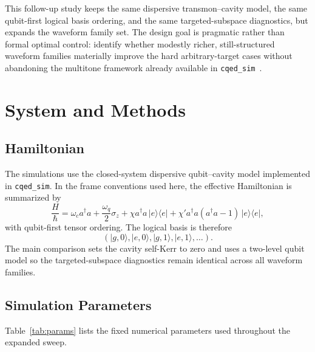 \documentclass[aps,pra,twocolumn,reprint,floatfix,amsmath,amssymb]{revtex4-2}
\begin{document}
This follow-up study keeps the same dispersive transmon--cavity model, the same qubit-first logical basis ordering, and the same targeted-subspace diagnostics, but expands the waveform family set. The design goal is pragmatic rather than formal optimal control: identify whether modestly richer, still-structured waveform families materially improve the hard arbitrary-target cases without abandoning the multitone framework already available in \texttt{cqed\_sim}~\cite{cqed_sim}.

\section{System and Methods}
\subsection{Hamiltonian}
The simulations use the closed-system dispersive qubit--cavity model implemented in \texttt{cqed\_sim}. In the frame conventions used here, the effective Hamiltonian is summarized by
\begin{equation}
\frac{H}{\hbar} = \omega_c a^\dagger a + \frac{\omega_q}{2}\sigma_z + \chi a^\dagger a \, |e\rangle\langle e| + \chi' a^\dagger a (a^\dagger a - 1) \, |e\rangle\langle e|,
\end{equation}
with qubit-first tensor ordering. The logical basis is therefore
\begin{equation}
(|g,0\rangle, |e,0\rangle, |g,1\rangle, |e,1\rangle, \ldots).
\end{equation}
The main comparison sets the cavity self-Kerr to zero and uses a two-level qubit model so the targeted-subspace diagnostics remain identical across all waveform families.

\subsection{Simulation Parameters}
Table~\ref{tab:params} lists the fixed numerical parameters used throughout the expanded sweep.
\end{document}
